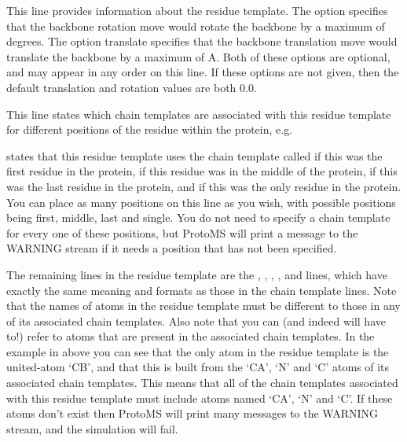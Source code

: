 \documentclass[letterpaper,10pt,english]{sphinxmanual}
\begin{document}
This line provides information about the residue template. The option   specifies that the backbone rotation move would rotate the backbone by a maximum of  degrees. The option translate  specifies that the backbone translation move would translate the backbone by a maximum of  A. Both of these options are optional, and may appear in any order on this line. If these options are not given, then the default translation and rotation values are both 0.0.

%
\begin{sphinxVerbatim}[commandchars=\\\{\}]
  
\end{sphinxVerbatim}

This line states which chain templates are associated with this residue template for different positions of the residue within the protein, e.g.

%
\begin{sphinxVerbatim}[commandchars=\\\{\}]
        
\end{sphinxVerbatim}

states that this residue template uses the chain template called  if this was the first residue in the protein,  if this residue was in the middle of the protein,  if this was the last residue in the protein, and  if this was the only residue in the protein. You can place as many positions on this line as you wish, with possible positions being first, middle, last and single. You do not need to specify a chain template for every one of these positions, but ProtoMS will print a message to the WARNING stream if it needs a position that has not been specified.

The remaining lines in the residue template are the , , , ,  and  lines, which have exactly the same meaning and formats as those in the chain template lines. Note that the names of atoms in the residue template must be different to those in any of its associated chain templates. Also note that you can (and indeed will have to!) refer to atoms that are present in the associated chain templates. In the example in above you can see that the only atom in the residue template is the united-atom ‘CB’, and that this is built from the ‘CA’, ‘N’ and ‘C’ atoms of its associated chain templates. This means that all of the chain templates associated with this residue template must include atoms named ‘CA’, ‘N’ and ‘C’. If these atoms don’t exist then ProtoMS will print many messages to the WARNING stream, and the simulation will fail.
\end{document}
